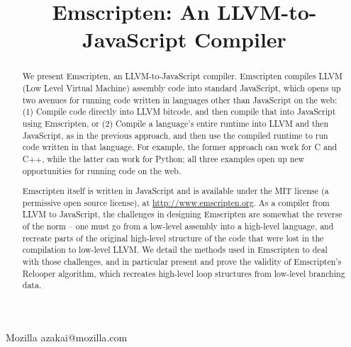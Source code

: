 \documentclass[preprint,10pt]{sigplanconf}
\begin{document}
\title{Emscripten: An LLVM-to-JavaScript Compiler}
\copyrightdata{[to be supplied]} 
\titlebanner{}        %
\preprintfooter{}   %
           {Mozilla}
           {azakai@mozilla.com}

\maketitle


\begin{abstract}
We present Emscripten, an LLVM-to-JavaScript compiler. Emscripten compiles
LLVM (Low Level Virtual Machine) assembly code into standard JavaScript, which opens up two avenues for running code written
in languages other than JavaScript on the web: (1) Compile code directly into LLVM bitcode, and
then compile that into JavaScript using Emscripten, or (2) Compile
a language's entire runtime into LLVM and then JavaScript, as in the previous
approach, and then use the compiled runtime to run code written in that language. For example, the
former approach can work for C and C++, while the latter can work for Python; all three
examples open up new opportunities for running code on the web.

Emscripten itself is written in JavaScript and is available under the MIT
license (a permissive open source license), at \url{http://www.emscripten.org}.
As a compiler from LLVM to JavaScript, the challenges in designing
Emscripten are somewhat the reverse of the norm -- one must go from a low-level
assembly into a high-level language, and recreate parts of the original
high-level structure of the code that were lost in the compilation to
low-level LLVM. We detail the methods used in
Emscripten to deal with those challenges, and in particular present and prove
the validity of Emscripten's Relooper
algorithm, which recreates high-level loop structures from low-level
branching data.
\end{abstract}
\end{document}
